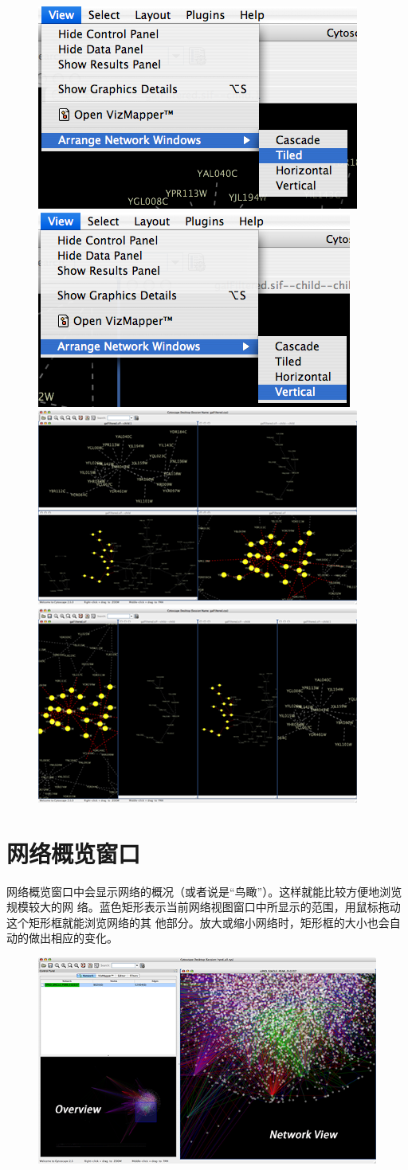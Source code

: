     \begin{figure}[!h]
    \includegraphics[width=.5\textwidth]{images/arrange_26_1.png} 
    \includegraphics[width=.5\textwidth]{images/arrange_26_3.png}
    \includegraphics[width=.5\textwidth]{images/arrange_26_2.png}
    \includegraphics[width=.5\textwidth]{images/arrange_26_4.png}
    \end{figure}


\section{网络概览窗口}

网络概览窗口中会显示网络的概况（或者说是“鸟瞰”）。这样就能比较方便地浏览规模较大的网
络。蓝色矩形表示当前网络视图窗口中所显示的范围，用鼠标拖动这个矩形框就能浏览网络的其
他部分。放大或缩小网络时，矩形框的大小也会自动的做出相应的变化。

\begin{figure}
\includegraphics[width=\textwidth]{images/network_overview_25.png}
\end{figure}	





